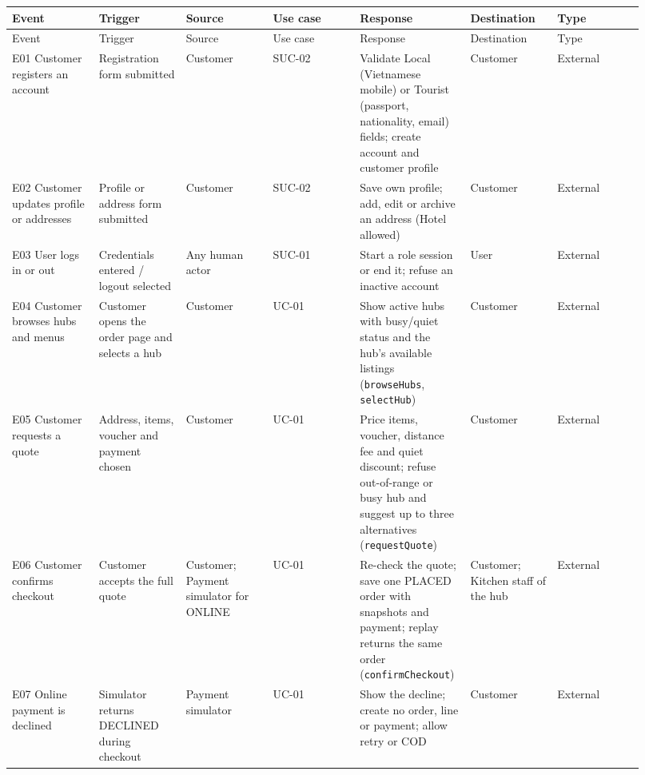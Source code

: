 \begin{landscape}
\begingroup\footnotesize
\begin{longtable}{>{\raggedright\arraybackslash}p{0.1314\linewidth}>{\raggedright\arraybackslash}p{0.1314\linewidth}>{\raggedright\arraybackslash}p{0.1314\linewidth}>{\raggedright\arraybackslash}p{0.1314\linewidth}>{\raggedright\arraybackslash}p{0.1314\linewidth}>{\raggedright\arraybackslash}p{0.1314\linewidth}>{\raggedright\arraybackslash}p{0.1314\linewidth}}
Event & Trigger & Source & Use case & Response & Destination & Type \\
\hline\endfirsthead
Event & Trigger & Source & Use case & Response & Destination & Type \\
\hline\endhead
E01 Customer registers an account & Registration form submitted & Customer & SUC-02 & Validate Local (Vietnamese mobile) or Tourist (passport, nationality, email) fields; create account and customer profile & Customer & External \\
E02 Customer updates profile or addresses & Profile or address form submitted & Customer & SUC-02 & Save own profile; add, edit or archive an address (Hotel allowed) & Customer & External \\
E03 User logs in or out & Credentials entered / logout selected & Any human actor & SUC-01 & Start a role session or end it; refuse an inactive account & User & External \\
E04 Customer browses hubs and menus & Customer opens the order page and selects a hub & Customer & UC-01 & Show active hubs with busy/quiet status and the hub's available listings (\texttt{browseHubs}, \texttt{selectHub}) & Customer & External \\
E05 Customer requests a quote & Address, items, voucher and payment chosen & Customer & UC-01 & Price items, voucher, distance fee and quiet discount; refuse out-of-range or busy hub and suggest up to three alternatives (\texttt{requestQuote}) & Customer & External \\
E06 Customer confirms checkout & Customer accepts the full quote & Customer; Payment simulator for ONLINE & UC-01 & Re-check the quote; save one PLACED order with snapshots and payment; replay returns the same order (\texttt{confirmCheckout}) & Customer; Kitchen staff of the hub & External \\
E07 Online payment is declined & Simulator returns DECLINED during checkout & Payment simulator & UC-01 & Show the decline; create no order, line or payment; allow retry or COD & Customer & External \\

\end{longtable}
\end{landscape}
